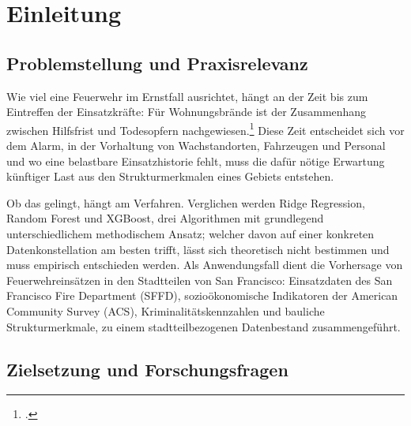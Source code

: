\documentclass[12pt,a4paper]{article}
\begin{document}
\newpage
{}
\setcounter{page}{1}

\section{Einleitung}
\subsection{Problemstellung und Praxisrelevanz}


Wie viel eine Feuerwehr im Ernstfall ausrichtet, hängt an der Zeit bis zum
Eintreffen der Einsatzkräfte: Für Wohnungsbrände ist der Zusammenhang zwischen Hilfsfrist und
Todesopfern nachgewiesen.\footcite[706]{Jaldell2017} Diese Zeit entscheidet
sich vor dem Alarm, in der Vorhaltung von Wachstandorten, Fahrzeugen und
Personal und wo eine belastbare Einsatzhistorie fehlt, muss die dafür
nötige Erwartung künftiger Last aus den Strukturmerkmalen eines Gebiets
entstehen.

Ob das gelingt, hängt am Verfahren. Verglichen werden Ridge Regression, Random
Forest und XGBoost, drei Algorithmen mit grundlegend unterschiedlichem
methodischem Ansatz; welcher davon auf einer konkreten Datenkonstellation am
besten trifft, lässt sich theoretisch nicht bestimmen und muss empirisch
entschieden werden. Als Anwendungsfall dient die Vorhersage von
Feuerwehreinsätzen in den Stadtteilen von San Francisco: Einsatzdaten des San
Francisco Fire Department (SFFD), sozioökonomische Indikatoren der American
Community Survey (ACS), Kriminalitätskennzahlen und bauliche Strukturmerkmale,
zu einem stadtteilbezogenen Datenbestand zusammengeführt.

\subsection{Zielsetzung und Forschungsfragen}
\end{document}
